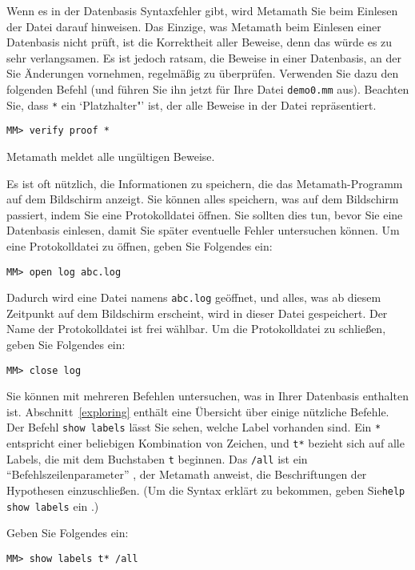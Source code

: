Wenn es in der Datenbasis Syntaxfehler gibt, wird Metamath Sie beim Einlesen der Datei darauf hinweisen.  Das Einzige, was Metamath beim Einlesen einer Datenbasis nicht prüft, ist die Korrektheit aller Beweise, denn das würde es zu sehr verlangsamen.
Es ist jedoch ratsam, die Beweise in einer Datenbasis, an der Sie Änderungen vornehmen, regelmäßig zu überprüfen.
Verwenden Sie dazu den folgenden Befehl (und führen Sie ihn jetzt für Ihre Datei \texttt{demo0.mm} aus).  Beachten Sie, dass \texttt{*} ein `Platzhalter"' ist, der alle Beweise in der Datei repräsentiert.
\begin{verbatim}
MM> verify proof *
\end{verbatim}
Metamath meldet alle ungültigen Beweise.

Es ist oft nützlich, die Informationen zu speichern, die das Metamath-Programm auf dem Bildschirm anzeigt. Sie können alles speichern, was auf dem Bildschirm passiert, indem Sie eine Protokolldatei öffnen. Sie sollten dies tun, bevor Sie eine Datenbasis einlesen, damit Sie später eventuelle Fehler untersuchen können.  Um eine Protokolldatei zu öffnen, geben Sie Folgendes ein:
\begin{verbatim}
MM> open log abc.log
\end{verbatim}
Dadurch wird eine Datei namens \texttt{abc.log} geöffnet, und alles, was ab diesem Zeitpunkt auf dem Bildschirm erscheint, wird in dieser Datei gespeichert.  Der Name der Protokolldatei ist frei wählbar. Um die Protokolldatei zu schließen, geben Sie Folgendes ein:
\begin{verbatim}
MM> close log
\end{verbatim}

Sie können mit mehreren Befehlen untersuchen, was in Ihrer Datenbasis enthalten ist.
Abschnitt~\ref{exploring} enthält eine Übersicht über einige nützliche Befehle.  Der Befehl \texttt{show labels} lässt Sie sehen, welche Label vorhanden sind.  Ein \texttt{*} entspricht einer beliebigen Kombination von Zeichen, und \texttt{t*} bezieht sich auf alle Labels, die mit dem Buchstaben \texttt{t} beginnen. Das \texttt{/all} ist ein "`Befehlszeilenparameter"' , der Metamath anweist, die Beschriftungen der Hypothesen einzuschließen.  (Um die Syntax erklärt zu bekommen, geben Sie\texttt{help show labels} ein .)  

Geben Sie Folgendes ein:
\begin{verbatim}
MM> show labels t* /all
\end{verbatim}

